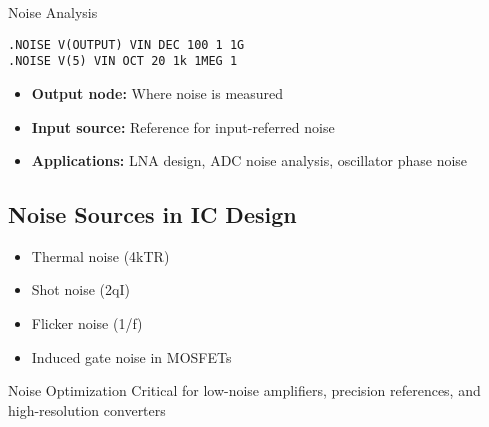 \documentclass{beamer}
\begin{document}
\begin{frame}{Noise Analysis}
    \begin{lstlisting}
.NOISE V(OUTPUT) VIN DEC 100 1 1G
.NOISE V(5) VIN OCT 20 1k 1MEG 1
    \end{lstlisting}
    
    \begin{itemize}
        \item \textbf{Output node:} Where noise is measured
        \item \textbf{Input source:} Reference for input-referred noise
        \item \textbf{Applications:} LNA design, ADC noise analysis, oscillator phase noise
    \end{itemize}
    
    \subsection{Noise Sources in IC Design}
    \begin{itemize}
        \item Thermal noise (4kTR)
        \item Shot noise (2qI)
        \item Flicker noise (1/f)
        \item Induced gate noise in MOSFETs
    \end{itemize}
    
    \begin{exampleblock}{Noise Optimization}
        Critical for low-noise amplifiers, precision references, and high-resolution converters
    \end{exampleblock}
\end{frame}
\end{document}
